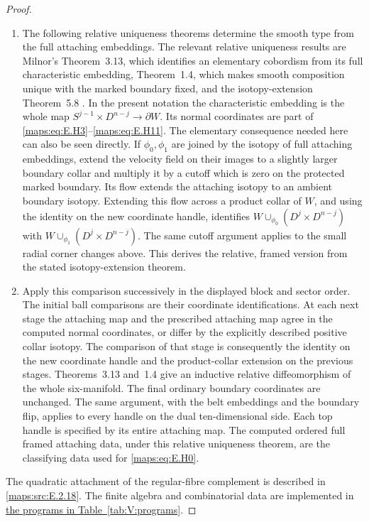 \documentclass[11pt,a4paper]{article}
\numberwithin{equation}{section}
\theoremstyle{definition}
\begin{document}
\begin{proof}
\begin{enumerate}[label=\arabic*.,leftmargin=*]
\item The following relative uniqueness theorems determine the smooth
type from the full attaching embeddings.  The relevant relative uniqueness
results are Milnor's Theorem~3.13, which identifies an elementary
cobordism from its full characteristic embedding, Theorem~1.4,
which makes smooth composition unique with the marked boundary
fixed, and the isotopy-extension Theorem~5.8
\cite[Theorem~3.13, pp.~31--32; Theorem~1.4, p.~2 and pp.~25--26; Theorem~5.8, pp.~63--64]{mapsMilnor65}.  In the present notation the characteristic
embedding is the whole map
$S^{j-1}\times D^{n-j}\longrightarrow\partial W$.  Its normal coordinates
are part of \eqref{maps:eq:E.H3}--\eqref{maps:eq:E.H11}.  The elementary consequence needed
here can also be seen directly.  If $\phi_0,\phi_1$ are joined
by the isotopy of full attaching embeddings, extend
the velocity field on their images to a slightly larger boundary
collar and multiply it by a cutoff which is zero on the protected
marked boundary.  Its flow extends the attaching isotopy to an
ambient boundary isotopy.  Extending this flow across a product
collar of $W$, and using the identity on the new coordinate handle,
identifies $W\cup_{\phi_0}(D^j\times D^{n-j})$ with
$W\cup_{\phi_1}(D^j\times D^{n-j})$.  The same cutoff argument
applies to the small radial corner changes above.  This derives
the relative, framed version from the stated isotopy-extension
theorem.

\item Apply this comparison successively in the displayed block and
sector order.  The initial ball comparisons are their coordinate
identifications.  At each next stage the attaching map
and the prescribed attaching map agree in the computed normal
coordinates, or differ by the explicitly described positive
collar isotopy.  The comparison of that stage is consequently
the identity on the new coordinate handle and the product-collar
extension on the previous stages.  Theorems~3.13 and~1.4 give an
inductive relative diffeomorphism of the whole six-manifold.
The final ordinary boundary coordinates are unchanged.  The
same argument, with the belt embeddings and the boundary flip, applies to every handle on the dual ten-dimensional
side.  Each top handle is specified by its entire attaching map.  The computed
ordered full framed attaching data, under this relative uniqueness
theorem, are the classifying data used for \eqref{maps:eq:E.H0}.
\end{enumerate}
The quadratic attachment of the regular-fibre complement is described in
\cref{maps:src:E.2.18}.
The finite algebra and combinatorial data are implemented in \hyperlink{prog:V:framings}{the programs in Table~\ref*{tab:V:programs}}.
\end{proof}
\end{document}
